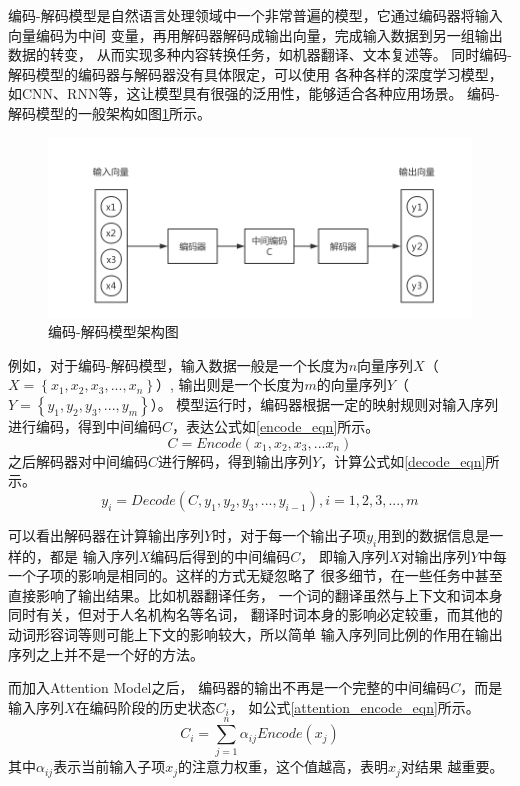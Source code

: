 \documentclass{standalone}
\begin{document}
编码-解码模型是自然语言处理领域中一个非常普遍的模型，它通过编码器将输入向量编码为中间
变量，再用解码器解码成输出向量，完成输入数据到另一组输出数据的转变，
从而实现多种内容转换任务，如机器翻译、文本复述等。
同时编码-解码模型的编码器与解码器没有具体限定，可以使用
各种各样的深度学习模型，如CNN、RNN等，这让模型具有很强的泛用性，能够适合各种应用场景。
编码-解码模型的一般架构如图\ref{Encoder}所示。
\begin{figure}[h]
    \includegraphics[scale=0.5]{picture/Encoder.png}
    \caption{编码-解码模型架构图}
    \label{Encoder}
\end{figure}
\fi

例如，对于编码-解码模型，输入数据一般是一个长度为$n$向量序列$X$（$X= \left \{x_1,x_2,x_3,...,x_n \right \}$）,
输出则是一个长度为$m$的向量序列$Y$（$Y= \left \{y_1,y_2,y_3,...,y_m \right \}$）。
模型运行时，编码器根据一定的映射规则对输入序列进行编码，得到中间编码$C$，表达公式如\ref{encode_eqn}所示。
\begin{equation}
    C=Encode\left ( x_1,x_2,x_3,...x_n \right )
    \label{encode_eqn}
\end{equation}
之后解码器对中间编码$C$进行解码，得到输出序列$Y$，计算公式如\ref{decode_eqn}所示。
\begin{equation}
    y_i=Decode\left ( C,y_1,y_2,y_3,...,y_{i-1} \right ),i=1,2,3,...,m
    \label{decode_eqn}
\end{equation}

可以看出解码器在计算输出序列$Y$时，对于每一个输出子项$y_i$用到的数据信息是一样的，都是
输入序列$X$编码后得到的中间编码$C$，
即输入序列$X$对输出序列$Y$中每一个子项的影响是相同的。这样的方式无疑忽略了
很多细节，在一些任务中甚至直接影响了输出结果。比如机器翻译任务，
一个词的翻译虽然与上下文和词本身同时有关，但对于人名机构名等名词，
翻译时词本身的影响必定较重，而其他的动词形容词等则可能上下文的影响较大，所以简单
输入序列同比例的作用在输出序列之上并不是一个好的方法。

而加入Attention Model之后，
编码器的输出不再是一个完整的中间编码$C$，而是输入序列$X$在编码阶段的历史状态$C_i$，
如公式\ref{attention_encode_eqn}所示。
\begin{equation}
    C_i=\sum_{j=1}^{n}\alpha_{ij}Encode\left ( x_j \right )
    \label{attention_encode_eqn}
\end{equation}
其中$\alpha_{ij}$表示当前输入子项$x_j$的注意力权重，这个值越高，表明$x_j$对结果
越重要。
\end{document}
